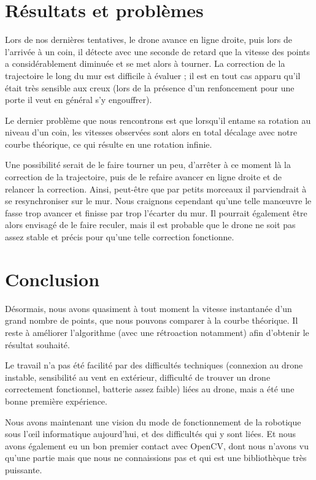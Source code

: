 \documentclass[titlepage,11pt,a4paper]{article}
\begin{document}
\section{Résultats et problèmes}
Lors de nos dernières tentatives, le drone avance en ligne droite, puis lors de l'arrivée à un coin, il détecte avec une seconde de retard que la vitesse des points a considérablement diminuée et se met alors à tourner. La correction de la trajectoire le long du mur est difficile à évaluer ; il est en tout cas apparu qu'il était très sensible aux creux (lors de la présence d'un renfoncement pour une porte il veut en général s'y engouffrer).

Le dernier problème que nous rencontrons est que lorsqu'il entame sa rotation au niveau d'un coin, les vitesses observées sont alors en total décalage avec notre courbe théorique, ce qui résulte en une rotation infinie.

Une possibilité serait de le faire tourner un peu, d'arrêter à ce moment là la correction de la trajectoire, puis de le refaire avancer en ligne droite et de relancer la correction. Ainsi, peut-être que par petits morceaux il parviendrait à se resynchroniser sur le mur. Nous craignons cependant qu'une telle manœuvre le fasse trop avancer et finisse par trop l'écarter du mur. Il pourrait également être alors envisagé de le faire reculer, mais il est probable que le drone ne soit pas assez stable et précis pour qu'une telle correction fonctionne.

\newpage

\section*{Conclusion}
Désormais, nous avons quasiment à tout moment la vitesse instantanée d'un grand nombre de points, que nous pouvons comparer à la courbe théorique. Il reste à améliorer l'algorithme (avec une rétroaction notamment) afin d'obtenir le résultat souhaité.

Le travail n'a pas été facilité par des difficultés techniques (connexion au drone instable, sensibilité au vent en extérieur, difficulté de trouver un drone correctement fonctionnel, batterie assez faible) liées au drone, mais a été une bonne première expérience.

Nous avons maintenant une vision du mode de fonctionnement de la robotique sous l'œil informatique aujourd'hui, et des difficultés qui y sont liées. Et nous avons également eu un bon premier contact avec OpenCV, dont nous n'avons vu qu'une partie mais que nous ne connaissions pas et qui est une bibliothèque très puissante.
\end{document}
